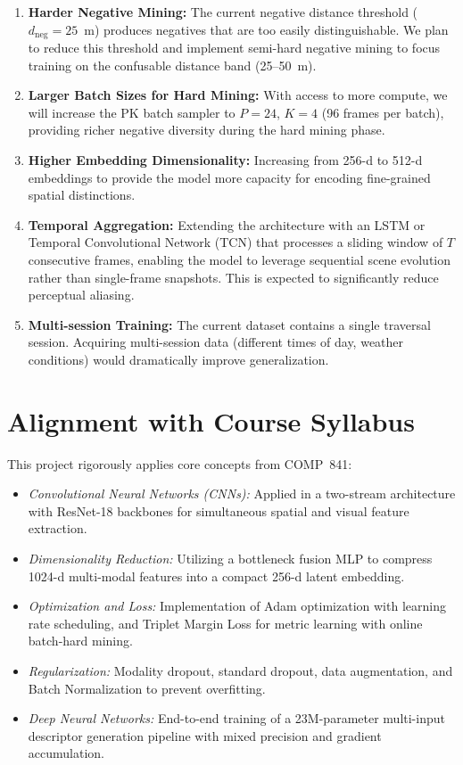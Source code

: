 \begin{enumerate}
    \item \textbf{Harder Negative Mining:} The current negative distance threshold ($d_{\text{neg}} = 25$~m) produces negatives that are too easily distinguishable. We plan to reduce this threshold and implement semi-hard negative mining to focus training on the confusable distance band (25--50~m).
    
    \item \textbf{Larger Batch Sizes for Hard Mining:} With access to more compute, we will increase the PK batch sampler to $P{=}24$, $K{=}4$ (96 frames per batch), providing richer negative diversity during the hard mining phase.
    
    \item \textbf{Higher Embedding Dimensionality:} Increasing from 256-d to 512-d embeddings to provide the model more capacity for encoding fine-grained spatial distinctions.
    
    \item \textbf{Temporal Aggregation:} Extending the architecture with an LSTM or Temporal Convolutional Network (TCN) that processes a sliding window of $T$ consecutive frames, enabling the model to leverage sequential scene evolution rather than single-frame snapshots. This is expected to significantly reduce perceptual aliasing.
    
    \item \textbf{Multi-session Training:} The current dataset contains a single traversal session. Acquiring multi-session data (different times of day, weather conditions) would dramatically improve generalization.
\end{enumerate}

\section{Alignment with Course Syllabus}
\label{sec:alignment}

This project rigorously applies core concepts from COMP~841:
\begin{itemize}
    \item \emph{Convolutional Neural Networks (CNNs):} Applied in a two-stream architecture with ResNet-18 backbones for simultaneous spatial and visual feature extraction.
    \item \emph{Dimensionality Reduction:} Utilizing a bottleneck fusion MLP to compress 1024-d multi-modal features into a compact 256-d latent embedding.
    \item \emph{Optimization and Loss:} Implementation of Adam optimization with learning rate scheduling, and Triplet Margin Loss for metric learning with online batch-hard mining.
    \item \emph{Regularization:} Modality dropout, standard dropout, data augmentation, and Batch Normalization to prevent overfitting.
    \item \emph{Deep Neural Networks:} End-to-end training of a 23M-parameter multi-input descriptor generation pipeline with mixed precision and gradient accumulation.
\end{itemize}

